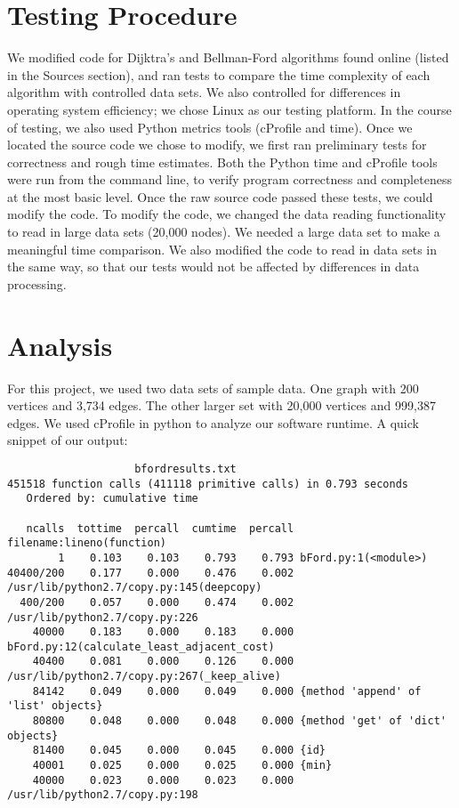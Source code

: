 \documentclass{article}
\begin{document}
\section{Testing Procedure}

We modified code for Dijktra's and Bellman-Ford algorithms found online (listed in the Sources section), and ran tests to compare the time complexity of each algorithm with controlled data sets.  We also controlled for differences in operating system efficiency; we chose Linux as our testing platform.  In the course of testing, we also used Python metrics tools (cProfile and time).  Once we located the source code we chose to modify, we first ran preliminary tests for correctness and rough time estimates.  Both the Python time and cProfile tools were run from the command line, to verify program correctness and completeness at the most basic level.  Once the raw source code passed these tests, we could modify the code.
To modify the code, we changed the data reading functionality to read in large data sets (20,000 nodes).  We needed a large data set to make a meaningful time comparison.
 We also modified the code to read in data sets in the same way, so that our tests would not be affected by differences in data processing.
 

\section{Analysis}
For this project, we used two data sets of sample data. One graph with 200 vertices and 3,734 edges. The other larger set with 20,000 vertices and 999,387 edges. We used cProfile in python to analyze our software runtime. A quick snippet of our output:
\begin{verbatim}
                    bfordresults.txt
451518 function calls (411118 primitive calls) in 0.793 seconds
   Ordered by: cumulative time

   ncalls  tottime  percall  cumtime  percall filename:lineno(function)
        1    0.103    0.103    0.793    0.793 bFord.py:1(<module>)
40400/200    0.177    0.000    0.476    0.002 /usr/lib/python2.7/copy.py:145(deepcopy)
  400/200    0.057    0.000    0.474    0.002 /usr/lib/python2.7/copy.py:226
    40000    0.183    0.000    0.183    0.000 bFord.py:12(calculate_least_adjacent_cost)
    40400    0.081    0.000    0.126    0.000 /usr/lib/python2.7/copy.py:267(_keep_alive)
    84142    0.049    0.000    0.049    0.000 {method 'append' of 'list' objects}
    80800    0.048    0.000    0.048    0.000 {method 'get' of 'dict' objects}
    81400    0.045    0.000    0.045    0.000 {id}
    40001    0.025    0.000    0.025    0.000 {min}
    40000    0.023    0.000    0.023    0.000 /usr/lib/python2.7/copy.py:198
\end{verbatim}
\end{document}
